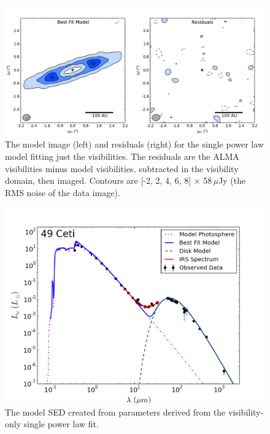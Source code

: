 \begin{figure}[t!]
\centering
\includegraphics[width = 1\textwidth]{49CET_Simple_Vis_ModelResidual.png}
\caption{The model image (left) and residuals (right) for the single power law model fitting just the visibilities. The residuals are the ALMA visibilities minus model visibilities, subtracted in the visibility domain, then imaged. Contours are [-2, 2, 4, 6, 8] $\times$ 58$\,\mu$Jy (the RMS noise of the data image).}
\label{fig:49CET_Simple_Vis_ModelResidual}
\end{figure}

\begin{figure}
\centering
\includegraphics[width = 1\textwidth]{49CET_Simple_Vis_SED_AllData.png}
\caption{The model SED created from parameters derived from the visibility-only single power law fit.}
\label{fig:49CET_Simple_Vis_SED}
\end{figure}

